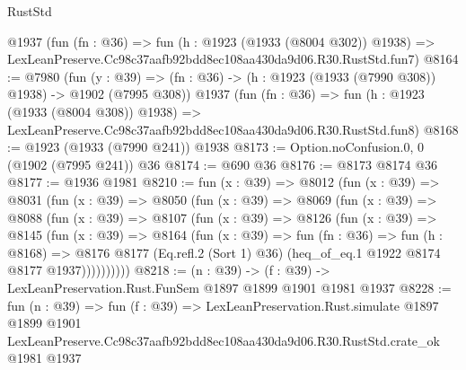 \begin{lexlean}{RustStd}
\begin{coremodule}
    @1937
    (fun (fn : @36) =>
    fun (h : @1923 (@1933 (@8004 @302)) @1938) =>
    LexLeanPreserve.Cc98c37aafb92bdd8ec108aa430da9d06.R30.RustStd.fun7)
@8164 := @7980
    (fun (y : @39) => (fn : @36) -> (h : @1923 (@1933 (@7990 @308)) @1938) -> @1902 (@7995 @308))
    @1937
    (fun (fn : @36) =>
    fun (h : @1923 (@1933 (@8004 @308)) @1938) =>
    LexLeanPreserve.Cc98c37aafb92bdd8ec108aa430da9d06.R30.RustStd.fun8)
@8168 := @1923 (@1933 (@7990 @241)) @1938
@8173 := Option.noConfusion.{0, 0} (@1902 (@7995 @241)) @36
@8174 := @690 @36
@8176 := @8173 @8174 @36
@8177 := @1936 @1981
@8210 := fun (x : @39) =>
  @8012
    (fun (x : @39) =>
    @8031
      (fun (x : @39) =>
      @8050
        (fun (x : @39) =>
        @8069
          (fun (x : @39) =>
          @8088
            (fun (x : @39) =>
            @8107
              (fun (x : @39) =>
              @8126
                (fun (x : @39) =>
                @8145
                  (fun (x : @39) =>
                  @8164
                    (fun (x : @39) =>
                    fun (fn : @36) =>
                    fun (h : @8168) =>
                    @8176
                      @8177
                      (Eq.refl.{2} (Sort 1) @36)
                      (heq_of_eq.{1} @1922 @8174 @8177 @1937))))))))))
@8218 := (n : @39) -> (f : @39) -> LexLeanPreservation.Rust.FunSem @1897 @1899 @1901 @1981 @1937
@8228 := fun (n : @39) =>
  fun (f : @39) =>
  LexLeanPreservation.Rust.simulate
    @1897
    @1899
    @1901
    LexLeanPreserve.Cc98c37aafb92bdd8ec108aa430da9d06.R30.RustStd.crate_ok
    @1981
    @1937
\end{coremodule}
\end{lexlean}
